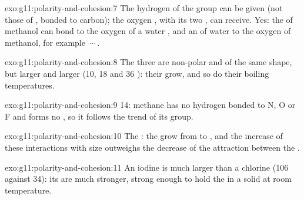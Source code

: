 \begin{solution}{exo:g11:polarity-and-cohesion:7}
The hydrogen of the  group can be given (not those of
, bonded to carbon); the oxygen , with its two ,
can receive. Yes: the  of methanol can bond to the oxygen of a
water , and an  of water to the oxygen of methanol, for
example \,$\cdots$\,.
\end{solution}

\begin{solution}{exo:g11:polarity-and-cohesion:8}
The three  are non-polar and of the same shape, but larger and
larger (10, 18 and 36 ): their  grow,
and so do their boiling temperatures.
\end{solution}

\begin{solution}{exo:g11:polarity-and-cohesion:9}
 14: methane has no hydrogen bonded to N, O or F and forms no
, so it follows the trend of its group.
\end{solution}

\begin{solution}{exo:g11:polarity-and-cohesion:10}
The : the  grow from  to
, and the increase of these interactions with size outweighs the
decrease of the attraction between the .
\end{solution}

\begin{solution}{exo:g11:polarity-and-cohesion:11}
An iodine  is much larger than a chlorine  (106
 against 34): its  are much stronger,
strong enough to hold the  in a solid at room temperature.
\end{solution}

